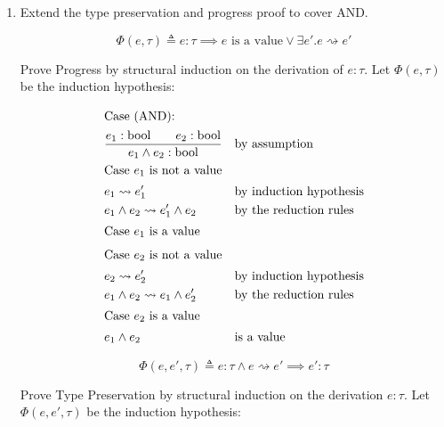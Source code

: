 \documentclass[10pt,\jkfside,a4paper]{article}
\begin{document}
\begin{enumerate}

    \item Extend the type preservation and progress proof to cover AND\@.

    \[
        \Phi(e, \tau) \triangleq e: \tau \implies e \text{ is a value} \vee \exists e'. e \rightsquigarrow e'
    \]

    Prove Progress by structural induction on the derivation of $e: \tau$. Let $\Phi(e, \tau)$ be the induction hypothesis:

    \begin{align*}
        \intertext{Case (AND):}
        & \dfrac{e_1: \mathrm{bool} \qquad e_2: \mathrm{bool}}{e_1 \land e_2: \mathrm{bool}} & & \text{by assumption} \\
        \intertext{Case $e_1$ is not a value}
        & e_1 \rightsquigarrow e_1' & & \text{by induction hypothesis} \\
        & e_1 \land e_2 \rightsquigarrow e_1' \land e_2 & & \text{by the reduction rules} \\
        \intertext{Case $e_1$ is a value}
        \intertext{Case $e_2$ is not a value}
        & e_2 \rightsquigarrow e_2' & & \text{by induction hypothesis} \\
        & e_1 \land e_2 \rightsquigarrow e_1 \land e_2' & & \text{by the reduction rules} \\
        \intertext{Case $e_2$ is a value}
        & e_1 \land e_2 & & \text{is a value}
    \end{align*}

    \[
        \Phi(e, e', \tau) \triangleq e: \tau \land e \rightsquigarrow e' \implies e': \tau
    \]

    Prove Type Preservation by structural induction on the derivation $e: \tau$. Let $\Phi(e, e', \tau)$ be the induction hypothesis:


\end{enumerate}
\end{document}
